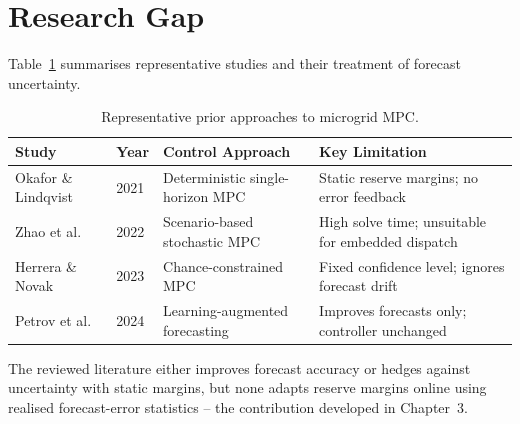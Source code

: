 \section{Research Gap}

Table~\ref{tab:litreview} summarises representative studies and their treatment of forecast uncertainty.

\begin{table}[htbp]
\centering
\caption{Representative prior approaches to microgrid MPC.}
\label{tab:litreview}
\renewcommand{\arraystretch}{1.3}
\begin{tabularx}{\textwidth}{@{}l l X X@{}}
\toprule
\rowcolor{monashblue!10}
\textbf{Study} & \textbf{Year} & \textbf{Control Approach} & \textbf{Key Limitation} \\
\midrule
Okafor \& Lindqvist & 2021 & Deterministic single-horizon MPC & Static reserve margins; no error feedback \\
Zhao et al.         & 2022 & Scenario-based stochastic MPC & High solve time; unsuitable for embedded dispatch \\
Herrera \& Novak     & 2023 & Chance-constrained MPC & Fixed confidence level; ignores forecast drift \\
Petrov et al.        & 2024 & Learning-augmented forecasting & Improves forecasts only; controller unchanged \\
\bottomrule
\end{tabularx}
\end{table}

The reviewed literature either improves forecast accuracy or hedges against uncertainty with static margins, but none adapts reserve margins online using realised forecast-error statistics -- the contribution developed in Chapter~3.

